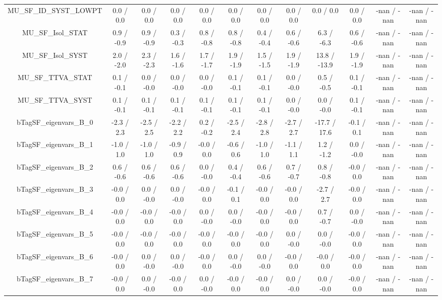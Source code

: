 \begin{table}[htbp]
\begin{center}
\begin{tabular}{|c|c|c|c|c|c|c|c|c|c|c|c|}
  MU_SF_ID_SYST_LOWPT & 0.0 / 0.0 & 0.0 / 0.0 & 0.0 / 0.0 & 0.0 / 0.0 & 0.0 / 0.0 & 0.0 / 0.0 & 0.0 / 0.0 & 0.0 / 0.0 & 0.0 / 0.0 & -nan / -nan & -nan / -nan \\ 
  MU_SF_Isol_STAT & 0.9 / -0.9 & 0.9 / -0.9 & 0.3 / -0.3 & 0.8 / -0.8 & 0.8 / -0.8 & 0.4 / -0.4 & 0.6 / -0.6 & 6.3 / -6.3 & 0.6 / -0.6 & -nan / -nan & -nan / -nan \\ 
  MU_SF_Isol_SYST & 2.0 / -2.0 & 2.3 / -2.3 & 1.6 / -1.6 & 1.7 / -1.7 & 1.9 / -1.9 & 1.5 / -1.5 & 1.9 / -1.9 & 13.8 / -13.9 & 1.9 / -1.9 & -nan / -nan & -nan / -nan \\ 
  MU_SF_TTVA_STAT & 0.1 / -0.1 & 0.0 / -0.0 & 0.0 / -0.0 & 0.0 / -0.0 & 0.1 / -0.1 & 0.1 / -0.1 & 0.0 / -0.0 & 0.5 / -0.5 & 0.1 / -0.1 & -nan / -nan & -nan / -nan \\ 
  MU_SF_TTVA_SYST & 0.1 / -0.1 & 0.1 / -0.1 & 0.1 / -0.1 & 0.1 / -0.1 & 0.1 / -0.1 & 0.1 / -0.1 & 0.0 / -0.0 & 0.0 / -0.0 & 0.1 / -0.1 & -nan / -nan & -nan / -nan \\ 
  bTagSF_eigenvars_B_0 & -2.3 / 2.3 & -2.5 / 2.5 & -2.2 / 2.2 & 0.2 / -0.2 & -2.5 / 2.4 & -2.8 / 2.8 & -2.7 / 2.7 & -17.7 / 17.6 & -0.1 / 0.1 & -nan / -nan & -nan / -nan \\ 
  bTagSF_eigenvars_B_1 & -1.0 / 1.0 & -1.0 / 1.0 & -0.9 / 0.9 & -0.0 / 0.0 & -0.6 / 0.6 & -1.0 / 1.0 & -1.1 / 1.1 & 1.2 / -1.2 & 0.0 / -0.0 & -nan / -nan & -nan / -nan \\ 
  bTagSF_eigenvars_B_2 & 0.6 / -0.6 & 0.6 / -0.6 & 0.6 / -0.6 & 0.0 / -0.0 & 0.4 / -0.4 & 0.6 / -0.6 & 0.7 / -0.7 & 0.8 / -0.8 & -0.0 / 0.0 & -nan / -nan & -nan / -nan \\ 
  bTagSF_eigenvars_B_3 & -0.0 / 0.0 & 0.0 / -0.0 & 0.0 / -0.0 & -0.0 / 0.0 & -0.1 / 0.1 & -0.0 / 0.0 & -0.0 / 0.0 & -2.7 / 2.7 & -0.0 / 0.0 & -nan / -nan & -nan / -nan \\ 
  bTagSF_eigenvars_B_4 & -0.0 / 0.0 & -0.0 / 0.0 & -0.0 / 0.0 & 0.0 / -0.0 & 0.0 / -0.0 & -0.0 / 0.0 & -0.0 / 0.0 & 0.7 / -0.7 & 0.0 / -0.0 & -nan / -nan & -nan / -nan \\ 
  bTagSF_eigenvars_B_5 & -0.0 / 0.0 & -0.0 / 0.0 & -0.0 / 0.0 & -0.0 / 0.0 & -0.0 / 0.0 & -0.0 / 0.0 & 0.0 / -0.0 & 0.0 / -0.0 & -0.0 / 0.0 & -nan / -nan & -nan / -nan \\ 
  bTagSF_eigenvars_B_6 & -0.0 / 0.0 & 0.0 / -0.0 & 0.0 / -0.0 & -0.0 / 0.0 & 0.0 / -0.0 & 0.0 / -0.0 & -0.0 / 0.0 & -0.0 / 0.0 & -0.0 / 0.0 & -nan / -nan & -nan / -nan \\ 
  bTagSF_eigenvars_B_7 & -0.0 / 0.0 & 0.0 / -0.0 & -0.0 / 0.0 & 0.0 / -0.0 & -0.0 / 0.0 & -0.0 / 0.0 & 0.0 / -0.0 & 0.0 / -0.0 & -0.0 / 0.0 & -nan / -nan & -nan / -nan \\ 

\end{tabular}
\end{center}
\end{table}
